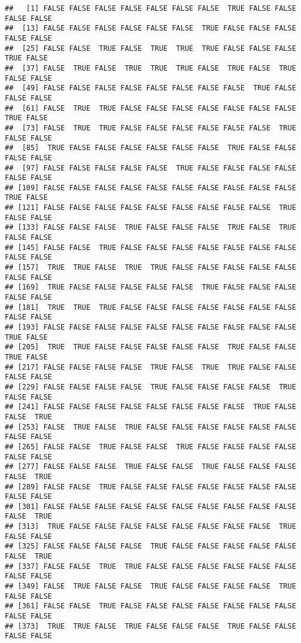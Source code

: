 \documentclass[
]{book}
\begin{document}
\begin{verbatim}
##   [1] FALSE FALSE FALSE FALSE FALSE FALSE FALSE  TRUE FALSE FALSE FALSE FALSE
##  [13] FALSE FALSE FALSE FALSE FALSE FALSE  TRUE FALSE FALSE FALSE FALSE FALSE
##  [25] FALSE FALSE  TRUE FALSE  TRUE  TRUE  TRUE FALSE FALSE FALSE  TRUE FALSE
##  [37] FALSE  TRUE FALSE  TRUE  TRUE  TRUE FALSE  TRUE FALSE  TRUE FALSE FALSE
##  [49] FALSE FALSE FALSE FALSE FALSE FALSE FALSE FALSE  TRUE FALSE FALSE FALSE
##  [61] FALSE  TRUE  TRUE FALSE FALSE FALSE FALSE FALSE FALSE FALSE  TRUE FALSE
##  [73] FALSE  TRUE  TRUE FALSE FALSE FALSE FALSE FALSE FALSE  TRUE FALSE FALSE
##  [85]  TRUE FALSE FALSE FALSE FALSE FALSE FALSE  TRUE FALSE FALSE FALSE FALSE
##  [97] FALSE FALSE FALSE FALSE FALSE  TRUE FALSE FALSE FALSE FALSE FALSE FALSE
## [109] FALSE FALSE FALSE FALSE FALSE FALSE FALSE FALSE FALSE FALSE  TRUE FALSE
## [121] FALSE FALSE FALSE FALSE FALSE FALSE FALSE FALSE FALSE  TRUE FALSE FALSE
## [133] FALSE FALSE FALSE  TRUE FALSE FALSE FALSE  TRUE FALSE  TRUE FALSE FALSE
## [145] FALSE FALSE  TRUE FALSE FALSE FALSE FALSE FALSE FALSE FALSE FALSE FALSE
## [157]  TRUE  TRUE FALSE  TRUE  TRUE FALSE FALSE FALSE FALSE FALSE FALSE FALSE
## [169]  TRUE FALSE FALSE FALSE FALSE FALSE  TRUE FALSE FALSE FALSE FALSE FALSE
## [181]  TRUE  TRUE  TRUE FALSE FALSE FALSE FALSE FALSE FALSE FALSE FALSE FALSE
## [193] FALSE FALSE FALSE FALSE FALSE FALSE FALSE FALSE FALSE FALSE  TRUE FALSE
## [205]  TRUE  TRUE FALSE FALSE FALSE FALSE FALSE  TRUE FALSE FALSE  TRUE FALSE
## [217] FALSE FALSE FALSE FALSE  TRUE FALSE  TRUE  TRUE FALSE FALSE FALSE FALSE
## [229] FALSE FALSE FALSE FALSE  TRUE FALSE FALSE FALSE FALSE  TRUE FALSE FALSE
## [241] FALSE FALSE FALSE FALSE FALSE FALSE FALSE FALSE  TRUE FALSE FALSE  TRUE
## [253] FALSE  TRUE FALSE  TRUE FALSE FALSE FALSE FALSE FALSE FALSE FALSE FALSE
## [265] FALSE FALSE  TRUE FALSE FALSE  TRUE FALSE FALSE FALSE FALSE FALSE FALSE
## [277] FALSE FALSE FALSE  TRUE FALSE FALSE  TRUE FALSE FALSE FALSE FALSE  TRUE
## [289] FALSE FALSE  TRUE FALSE FALSE FALSE FALSE FALSE FALSE FALSE FALSE FALSE
## [301] FALSE FALSE FALSE FALSE FALSE FALSE FALSE FALSE FALSE FALSE FALSE  TRUE
## [313]  TRUE FALSE FALSE FALSE FALSE FALSE FALSE FALSE FALSE  TRUE FALSE FALSE
## [325] FALSE FALSE FALSE FALSE  TRUE FALSE FALSE FALSE FALSE FALSE FALSE  TRUE
## [337] FALSE FALSE  TRUE  TRUE FALSE FALSE FALSE FALSE FALSE FALSE FALSE FALSE
## [349] FALSE  TRUE FALSE FALSE  TRUE FALSE FALSE FALSE FALSE  TRUE FALSE FALSE
## [361] FALSE FALSE  TRUE FALSE FALSE FALSE FALSE FALSE FALSE FALSE FALSE FALSE
## [373]  TRUE  TRUE FALSE  TRUE FALSE FALSE FALSE  TRUE FALSE FALSE FALSE FALSE

\end{verbatim}
\end{document}

